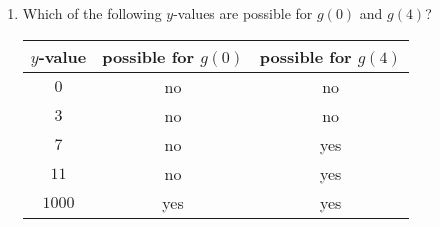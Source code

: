 \documentclass[11pt]{article}
\begin{document}
\begin{enumerate}
\begin{enumerate}
{\begin{center}
      \end{center}
    }
    \vfill
  \item Which of the following $y$-values are possible for $g(0)$ and $g(4)$?
    \begin{center}
      \begin{tabular}{|c|c|c|}
        \hline
        $y$-value & possible for $g(0)$ & possible for $g(4)$\\
        \hline
        $0$&{\color{blue} no}&{\color{blue} no}\\
        \hline
        $3$&{\color{blue} no}&{\color{blue} no}\\
        \hline
        $7$&{\color{blue} no}&{\color{blue} yes}\\
        \hline
        $11$&{\color{blue} no}&{\color{blue} yes}\\
        \hline
        $1000$&{\color{blue} yes}&{\color{blue} yes}\\
        \hline
      \end{tabular}
    \end{center}
  \end{enumerate}

\end{enumerate}
\end{document}
